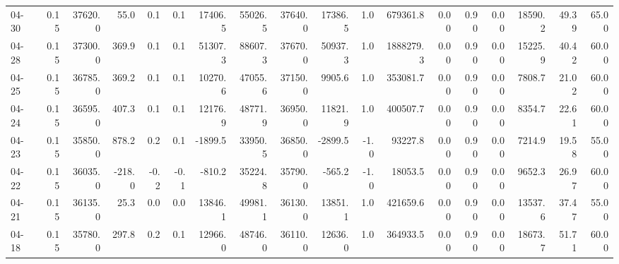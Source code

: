 \begin{threeparttable}
{\begin{tabular}{lrrrrrrrrrrrrrrrrr}
  04-30 &     0.15 & 37620.0 &              55.0 &               0.1 &                0.1 &            17406.5 & 55026.5 & 37640.0 &    17386.5 &                      1.0 &            679361.8 &       0.00 &      0.90 &           0.00 &          18590.2 &           49.39 &                  65.00 \\
  04-28 &     0.15 & 37300.0 &             369.9 &               0.1 &                0.1 &            51307.3 & 88607.3 & 37670.0 &    50937.3 &                      1.0 &           1888279.3 &       0.00 &      0.90 &           0.00 &          15225.9 &           40.42 &                  60.00 \\
  04-25 &     0.15 & 36785.0 &             369.2 &               0.1 &                0.1 &            10270.6 & 47055.6 & 37150.0 &     9905.6 &                      1.0 &            353081.7 &       0.00 &      0.90 &           0.00 &           7808.7 &           21.02 &                  60.00 \\
  04-24 &     0.15 & 36595.0 &             407.3 &               0.1 &                0.1 &            12176.9 & 48771.9 & 36950.0 &    11821.9 &                      1.0 &            400507.7 &       0.00 &      0.90 &           0.00 &           8354.7 &           22.61 &                  60.00 \\
  04-23 &     0.15 & 35850.0 &             878.2 &               0.2 &                0.1 &            -1899.5 & 33950.5 & 36850.0 &    -2899.5 &                     -1.0 &             93227.8 &       0.00 &      0.90 &           0.00 &           7214.9 &           19.58 &                  55.00 \\
  04-22 &     0.15 & 36035.0 &            -218.0 &              -0.2 &               -0.1 &             -810.2 & 35224.8 & 35790.0 &     -565.2 &                     -1.0 &             18053.5 &       0.00 &      0.90 &           0.00 &           9652.3 &           26.97 &                  60.00 \\
  04-21 &     0.15 & 36135.0 &              25.3 &               0.0 &                0.0 &            13846.1 & 49981.1 & 36130.0 &    13851.1 &                      1.0 &            421659.6 &       0.00 &      0.90 &           0.00 &          13537.6 &           37.47 &                  55.00 \\
  04-18 &     0.15 & 35780.0 &             297.8 &               0.2 &                0.1 &            12966.0 & 48746.0 & 36110.0 &    12636.0 &                      1.0 &            364933.5 &       0.00 &      0.90 &           0.00 &          18673.7 &           51.71 &                  60.00 \\

\end{tabular}}
\end{threeparttable}
